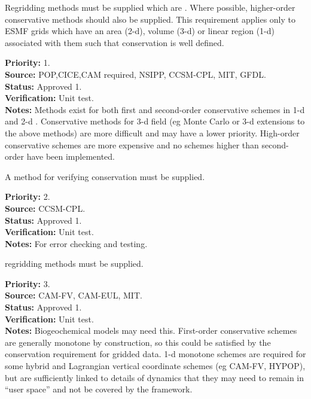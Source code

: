 Regridding methods must be supplied which are
.  Where possible,
higher-order conservative methods should also be supplied.  This requirement
applies only to ESMF grids which have an area (2-d), volume (3-d) or
linear region (1-d) associated with them such that conservation is well
defined.

\begin{reqlist}
{\bf Priority:} 1. \\
{\bf Source:} POP,CICE,CAM required, NSIPP, CCSM-CPL, MIT, GFDL. \\
{\bf Status:} Approved 1. \\
{\bf Verification:} Unit test. \\
{\bf Notes:} Methods exist for both first and second-order
             conservative schemes in 1-d and 2-d \cite{Jones1999}.
             Conservative methods for 3-d field (eg Monte Carlo
             or 3-d extensions to the above methods) are more difficult
             and may have a lower priority.
             High-order conservative schemes are more expensive and
             no schemes higher than second-order have been implemented.
\end{reqlist}


A method for verifying conservation must be supplied.

\begin{reqlist}
{\bf Priority:} 2. \\
{\bf Source:} CCSM-CPL. \\
{\bf Status:} Approved 1. \\
{\bf Verification:} Unit test. \\
{\bf Notes:} For error checking and testing.
\end{reqlist}


 regridding methods must be supplied.

\begin{reqlist}
{\bf Priority:} 3. \\
{\bf Source:} CAM-FV, CAM-EUL, MIT. \\
{\bf Status:} Approved 1. \\
{\bf Verification:} Unit test. \\
{\bf Notes:} Biogeochemical models may need this.  First-order
             conservative schemes are generally monotone by
             construction, so this could be satisfied by the
             conservation requirement for gridded data.
             1-d monotone schemes are required for some hybrid
             and Lagrangian vertical coordinate schemes
             (eg CAM-FV, HYPOP), but are sufficiently linked
             to details of dynamics that they may need to
             remain in ``user space'' and not be covered by
             the framework.
\end{reqlist}

